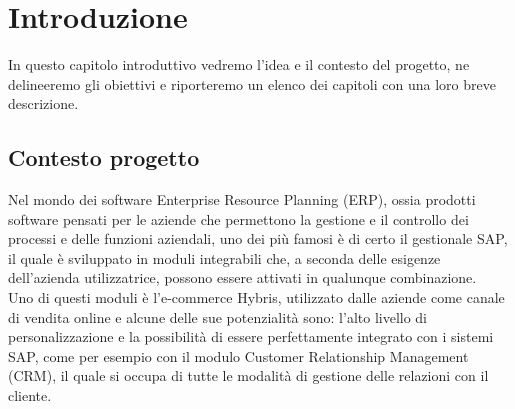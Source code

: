 
\chapter{Introduzione}
In questo capitolo introduttivo vedremo l'idea e il contesto del progetto, ne delineeremo gli obiettivi e riporteremo un elenco dei capitoli con una loro breve descrizione.
\section{Contesto progetto}
Nel mondo dei software Enterprise Resource Planning (ERP), ossia prodotti software pensati per le aziende che permettono la gestione e il controllo dei processi e delle funzioni aziendali, uno dei più famosi è di certo il gestionale SAP, il quale è sviluppato in moduli integrabili che, a seconda delle esigenze dell'azienda utilizzatrice, possono essere attivati in qualunque combinazione.\\
Uno di questi moduli è l'e-commerce Hybris, utilizzato dalle aziende come canale di vendita online e alcune delle sue potenzialità sono: l'alto livello di personalizzazione e la possibilità di essere perfettamente integrato con i sistemi SAP, come per esempio con il modulo Customer Relationship Management (CRM), il quale si occupa di tutte le modalità di gestione delle relazioni con il cliente.

